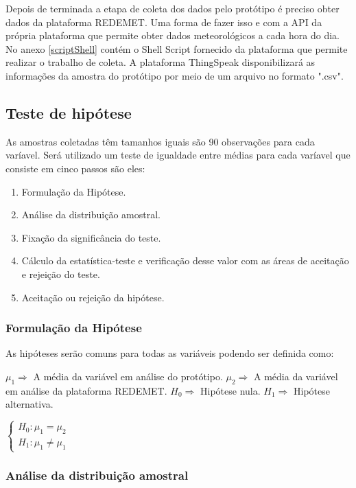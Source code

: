 Depois de terminada a etapa de coleta dos dados pelo protótipo é preciso obter dados da plataforma REDEMET. Uma forma de fazer isso e com a API da própria plataforma que permite obter dados meteorológicos a cada hora do dia. No anexo \ref{scriptShell} contém o Shell Script fornecido da plataforma que permite realizar o trabalho de coleta. A plataforma ThingSpeak disponibilizará as informações da amostra do protótipo por meio de um arquivo no formato ".csv".

\subsection{Teste de hipótese}

As amostras coletadas têm tamanhos iguais são 90 observações para cada varíavel. Será utilizado um teste de igualdade entre médias para cada varíavel que consiste em cinco passos são eles:

\begin{enumerate}
   \item Formulação da Hipótese.
   \item Análise da distribuição amostral.
   \item Fixação da significância do teste.
   \item Cálculo da estatística-teste e verificação desse valor com as áreas de aceitação e rejeição do teste.
   \item Aceitação ou rejeição da hipótese.
\end{enumerate}

\subsubsection{Formulação da Hipótese}
As hipóteses serão comuns para todas as variáveis podendo ser definida como:

{\raggedright $\mu_1 \Rightarrow$ A média da variável em análise do protótipo. 
\newline $\mu_2 \Rightarrow$ A média da variável em análise da plataforma REDEMET. 
\newline $ H_0 \Rightarrow$ Hipótese nula.
\newline $ H_1 \Rightarrow$ Hipótese alternativa.

$
\begin{cases}
H_0: \mu_1 = \mu_2 \\
H_1: \mu_1 \neq \mu_1
\end{cases}
$
}

\subsubsection{Análise da distribuição amostral}

